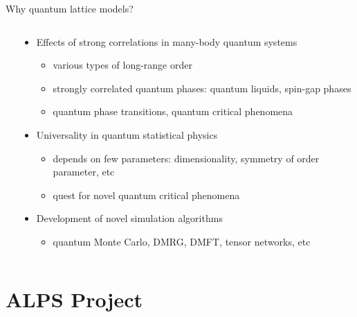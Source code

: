 \begin{frame}[t,fragile]{Why quantum lattice models?}
\begin{columns}[T]
\begin{column}{.2\textwidth}
    \end{column}
    \begin{column}{.8\textwidth}
      \begin{itemize}
      \item Effects of strong correlations in many-body quantum systems
        \begin{itemize}
        \item various types of long-range order
        \item strongly correlated quantum phases: quantum liquids, spin-gap phases
        \item quantum phase transitions, quantum critical phenomena
        \end{itemize}
      \item Universality in quantum statistical physics
        \begin{itemize}
        \item depends on few parameters: dimensionality, symmetry of order parameter, etc
        \item quest for novel quantum critical phenomena
        \end{itemize}
      \item Development of novel simulation algorithms
        \begin{itemize}
        \item quantum Monte Carlo, DMRG, DMFT, tensor networks, etc
        \end{itemize}
      \end{itemize}
    \end{column}
  \end{columns}
\end{frame}

\section{ALPS Project}
\subsection*{\redb\whiteb\greenb}

